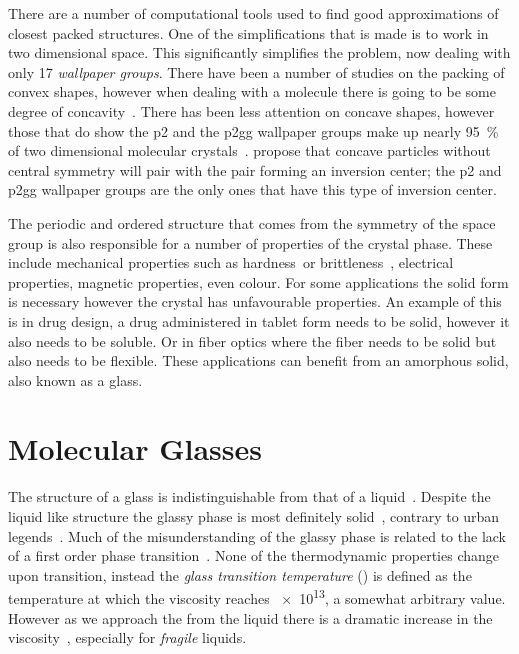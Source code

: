 There are a number of computational tools used to find good approximations of closest packed structures\tocite. One of the simplifications that is made is to work in two dimensional space. This significantly simplifies the problem, now dealing with only 17 \emph{wallpaper groups}\figref{}. There have been a number of studies on the packing of convex shapes, however when dealing with a molecule there is going to be some degree of concavity~\figref{}. There has been less attention on concave shapes, however those that do show the p2 and the p2gg wallpaper groups make up nearly \SI{95}{\percent} of two dimensional molecular crystals~\tocite. \tocite propose that concave particles without central symmetry will pair with the pair forming an inversion center; the p2 and p2gg wallpaper groups are the only ones that have this type of inversion center. 

The periodic and ordered structure that comes from the symmetry of the space group is also responsible for a number of properties of the crystal phase. These include mechanical properties such as hardness~\tocite or brittleness~\tocite, electrical properties\tocite, magnetic properties\tocite, even colour\tocite. For some applications the solid form is necessary however the crystal has unfavourable properties. An example of this is in drug design, a drug administered in tablet form needs to be solid, however it also needs to be soluble\tocite. Or in fiber optics where the fiber needs to be solid but also needs to be flexible\tocite. These applications can benefit from an amorphous solid, also known as a glass.

\section{Molecular Glasses}

The structure of a glass is indistinguishable from that of a liquid~\figref{}. Despite the liquid like structure the glassy phase is most definitely solid~\tocite, contrary to urban legends~\tocite. Much of the misunderstanding of the glassy phase is related to the lack of a first order phase transition~\tocite. None of the thermodynamic properties change upon transition, instead the \emph{glass transition temperature} (\si{\Tg}) is defined as the temperature at which the viscosity reaches \SI{e13}{\poise}, a somewhat arbitrary value. However as we approach the \si{\Tg} from the liquid there is a dramatic increase in the viscosity~\figref{}, especially for \emph{fragile} liquids.

